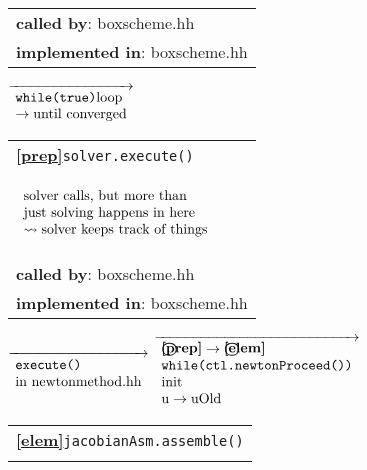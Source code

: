 \begin{landscape}
{\begin{tabular}{|l|}
      \textbf{called by}: boxscheme.hh\\
      \textbf{implemented in}: boxscheme.hh\\  
	\hline
  \end{tabular}
    {\scriptsize$\overrightarrow{
      \begin{array}{l}
	\textnormal{\texttt{while(true)}loop} \\
	\rightarrow \textnormal{until converged}
      \end{array} } $}
    \begin{tabular}{|l|}
      \hline
            \textbf{\textcircled{\ref{prep}}}\verb+solver.execute()+ \\
            \begin{scriptsize}$\begin{array}{l}
      \textnormal{solver calls, but more than} \\ 
      \textnormal{just solving happens in here} \\
      \rightsquigarrow\textnormal{solver keeps track of things}
      \end{array}$\end{scriptsize}\\
      \textbf{called by}: boxscheme.hh\\
      \textbf{implemented in}: boxscheme.hh\\  
    \hline
  \end{tabular}
\nextline
    {\scriptsize$\overrightarrow{ \begin{array}{l}
                                  \texttt{execute()}\\
				  \textnormal{in newtonmethod.hh}
                                 \end{array}
    }$
    $\overrightarrow{ \begin{array}{l}
				  \textbf{\textcircled{\ref{prep}}} \rightarrow \textbf{\textcircled{\ref{elem}}}\\
                                  \texttt{while(ctl.newtonProceed())}\\
				  \textnormal{init}\\
				  \textnormal{u} \rightarrow \textnormal{uOld}
                                 \end{array}
    }$}
    \begin{tabular}{|l|}
      \hline      
	\textbf{\textcircled{\ref{elem}}}\verb+jacobianAsm.assemble()+ \\
    \begin{scriptsize}\end{scriptsize}\\

\end{tabular}}
\end{landscape}
